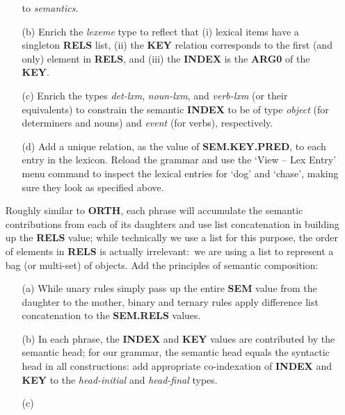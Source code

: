 \documentclass[10pt]{article}
\newcommand{\att}[1]{{\mbox{\scriptsize {\bf #1}}}}
\begin{document}
\begin{enumerate}
\begin{itemize}
                to {\it semantics}.
          \item [(b)]
                Enrich the {\it lexeme} type to reflect that (i)
                lexical items have a singleton \att{RELS} list, (ii)
                the \att{KEY} relation corresponds to the first (and
                only) element in \att{RELS}, and (iii) the \att{INDEX}
                is the \att{ARG0} of the \att{KEY}.
          \item [(c)]
                Enrich the types {\it det-lxm}, {\it noun-lxm}, and
                {\it verb-lxm} (or their equivalents) to constrain the
                semantic \att{INDEX} to be of type {\it object} (for
                determiners and nouns) and {\it event} (for verbs),
                respectively.
          \item [(d)]
                Add a unique relation, as the value of
                \att{SEM.KEY.PRED}, to each entry in the lexicon.
                Reload the grammar and use the `View -- Lex Entry' menu
                command to inspect the lexical entries for `dog' and
                `chase', making sure they look as specified above.
        \end{itemize}
  \item []
        Roughly similar to \att{ORTH}, each phrase will accumulate the
        semantic contributions from each of its daughters and use list
        concatenation in building up the \att{RELS} value; while
        technically we use a list for this purpose, the order of
        elements in \att{RELS} is actually irrelevant:\ we are using a
        list to represent a bag (or multi-set) of objects.
        Add the principles of semantic composition:
        \begin{itemize}
          \item [(a)]
                While unary rules simply pass up the entire \att{SEM}
                value from the daughter to the mother, binary and
                ternary rules apply difference list concatenation to
                the \att{SEM.RELS} values.
          \item [(b)]
                In each phrase, the \att{INDEX} and \att{KEY} values
                are contributed by the semantic head; for our grammar,
                the semantic head equals the syntactic head in all
                constructions: add appropriate co-indexation of
                \att{INDEX} and \att{KEY} to the {\it head-initial}
                and {\it head-final} types.
          \item [(c)]

\end{itemize}
\end{enumerate}
\end{document}

